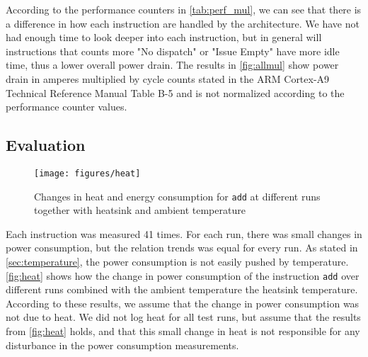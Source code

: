 According to the performance counters in \autoref{tab:perf_mul}, we can see that
there is a difference in how each instruction are handled by the architecture.
We have not had enough time to look deeper into each instruction, but in general
will instructions that counts more "No dispatch" or "Issue Empty" have more idle
time, thus a lower overall power drain. The results in \autoref{fig:allmul} show
power drain in amperes multiplied by cycle counts stated in the ARM Cortex-A9
Technical Reference Manual Table B-5\cite{armtech} and is not normalized
according to the performance counter values.

\subsection{Evaluation}
\begin{figure}
    \centering
    \texttt{[image: figures/heat]}
    \caption{Changes in heat and energy consumption for \texttt{add} at
    different runs together with heatsink and ambient temperature}
    \label{fig:heat}
\end{figure}

Each instruction was measured 41 times. For each run, there was small changes in
power consumption, but the relation trends was equal for every run.  As stated
in \autoref{sec:temperature}, the power consumption is not easily pushed by
temperature. \autoref{fig:heat} shows how the change in power consumption of the
instruction \texttt{add} over different runs combined with the ambient
temperature the heatsink temperature. According to these results, we assume that
the change in power consumption was not due to heat. We did not log heat for all
test runs, but assume that the results from \autoref{fig:heat} holds, and that
this small change in heat is not responsible for any disturbance in the power
consumption measurements.


